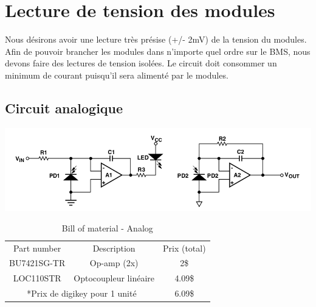 

\section{Lecture de tension des modules}
				Nous d\'{e}sirons avoir une lecture tr\`{e}s pr\'{e}sise (+/- 2mV) de la tension du modules. Afin de pouvoir brancher les modules dans n'importe quel ordre sur le BMS, nous devons faire des lectures de tension isol\'{e}es. Le circuit doit consommer un minimum de courant puisqu'il sera aliment\'{e} par le modules.
			\subsection{Circuit analogique}
				
				\begin{center}
					\includegraphics[scale=0.5]{Lecture/images/Analog} \\ \vspace{0cm}
				\end{center}
			
					\begin{table}[h!]	
						\centering
						\begin{tabular}{|c|c|c|}
							\hline
							Part number & Description & Prix (total)\\ \hhline{|=|=|=|}
							BU7421SG-TR & Op-amp (2x) & 2\$ \\ \hline
							LOC110STR & Optocoupleur lin\'{e}aire & 4.09\$ \\ \hline
							 \multicolumn{2}{|c|}{*Prix de digikey pour 1 unit\'{e} }& 6.09\$ \\ \hline
						\end{tabular}
						\caption{Bill of material - Analog}
					\end{table}
						
